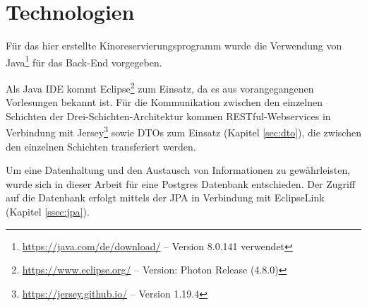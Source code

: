 \section{Technologien}
\label{sec:technologien}
\authorsection{\authorSG}

Für das hier erstellte Kinoreservierungsprogramm wurde die Verwendung von Java\footnote{\url{https://java.com/de/download/} -- Version 8.0.141 verwendet} für das Back-End vorgegeben. 

Als Java \acs{IDE} kommt Eclipse\footnote{\url{https://www.eclipse.org/} -- Version: Photon Release (4.8.0)} zum Einsatz, da es aus vorangegangenen Vorlesungen bekannt ist.
Für die Kommunikation zwischen den einzelnen Schichten der Drei-Schichten-Architektur kommen \acs{REST}ful-Webservices in Verbindung mit Jersey\footnote{\url{https://jersey.github.io/} -- Version 1.19.4} sowie \acp{DTO} zum Einsatz (Kapitel \vref{sec:dto}), die zwischen den einzelnen Schichten transferiert werden. 

Um eine Datenhaltung und den Austausch von Informationen zu gewährleisten, wurde sich in dieser Arbeit für eine Postgres Datenbank entschieden.
Der Zugriff auf die Datenbank erfolgt mittels der \ac{JPA} in Verbindung mit EclipseLink (Kapitel \vref{ssec:jpa}).  